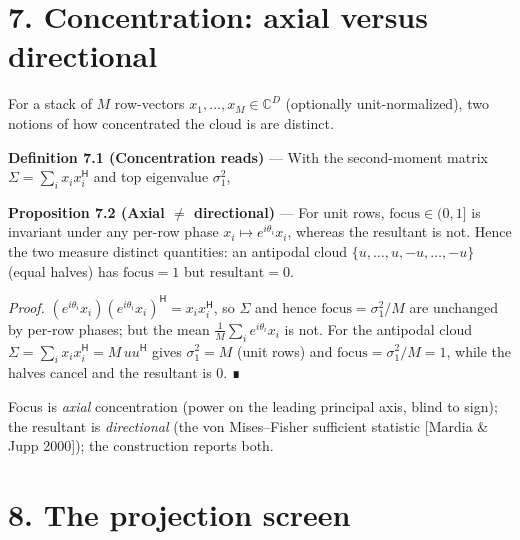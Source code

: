 \documentclass[10pt,letterpaper,twocolumn]{article}
\begin{document}
\section{7. Concentration: axial versus directional}\label{7-concentration-axial-versus-directional}

For a stack of \(M\) row-vectors \(x_1,\dots,x_M\in\mathbb{C}^D\) (optionally unit-normalized), two notions of how concentrated the cloud is are distinct.

\textbf{Definition 7.1 (Concentration reads)} --- With the second-moment matrix \(\Sigma=\sum_i x_ix_i^{\mathsf H}\) and top eigenvalue \(\sigma_1^2\),


\textbf{Proposition 7.2 (Axial \(\ne\) directional)} --- For unit rows, \(\text{focus}\in(0,1]\) is invariant under any per-row phase \(x_i\mapsto e^{i\theta_i}x_i\), whereas the resultant is not. Hence the two measure distinct quantities: an antipodal cloud \(\{u,\dots,u,-u,\dots,-u\}\) (equal halves) has \(\text{focus}=1\) but \(\text{resultant}=0\).

\emph{Proof.} \((e^{i\theta_i}x_i)(e^{i\theta_i}x_i)^{\mathsf H}=x_ix_i^{\mathsf H}\), so \(\Sigma\) and hence \(\text{focus}=\sigma_1^2/M\) are unchanged by per-row phases; but the mean \(\frac1M\sum_i e^{i\theta_i}x_i\) is not. For the antipodal cloud \(\Sigma=\sum_i x_ix_i^{\mathsf H}=M\,uu^{\mathsf H}\) gives \(\sigma_1^2=M\) (unit rows) and \(\text{focus}=\sigma_1^2/M=1\), while the halves cancel and the resultant is \(0\). ∎

Focus is \emph{axial} concentration (power on the leading principal axis, blind to sign); the resultant is \emph{directional} (the von Mises--Fisher sufficient statistic {[}Mardia \& Jupp 2000{]}); the construction reports both.

\section{8. The projection screen}\label{8-the-projection-screen}
\end{document}
